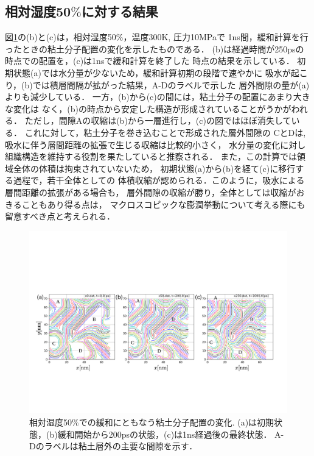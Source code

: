 \subsection{相対湿度50$\%$に対する結果}
図\ref{fig:fig3}の(b)と(c)は，相対湿度50$\%$，温度300K, 圧力10MPaで
1ns間，緩和計算を行ったときの粘土分子配置の変化を示したものである．
(b)は経過時間が250psの時点での配置を，(c)は1nsで緩和計算を終了した
時点の結果を示している．
初期状態(a)では水分量が少ないため，緩和計算初期の段階で速やかに
吸水が起こり，(b)では積層間隔が拡がった結果，A-Dのラベルで示した
層外間隙の量が(a)よりも減少している．
一方，(b)から(c)の間には，粘土分子の配置にあまり大きな変化は
なく，(b)の時点から安定した構造が形成されていることがうかがわれる．
ただし，間隙Aの収縮は(b)から一層進行し，(c)の図ではほぼ消失している．
これに対して，粘土分子を巻き込むことで形成された層外間隙の
CとDは,吸水に伴う層間距離の拡張で生じる収縮は比較的小さく，
水分量の変化に対し組織構造を維持する役割を果たしていると推察される．
また，この計算では領域全体の体積は拘束されていないため，
初期状態(a)から(b)を経て(c)に移行する過程で，若干全体としての
体積収縮が認められる．このように，吸水による層間距離の拡張がある場合も，
層外間隙の収縮が勝り，全体としては収縮がおきることもあり得る点は，
マクロスコピックな膨潤挙動について考える際にも留意すべき点と考えられる．
\begin{figure}[t]
	\begin{center}
	\includegraphics[width=1.0\linewidth]{Figs/fig3.pdf} 
	\end{center}
	\caption{
		相対湿度50$\%$での緩和にともなう粘土分子配置の変化.  
		(a)は初期状態，(b)緩和開始から200psの状態，(c)は1ns経過後の最終状態．
		A-Dのラベルは粘土層外の主要な間隙を示す．
	} 
	\label{fig:fig3}
\end{figure}
